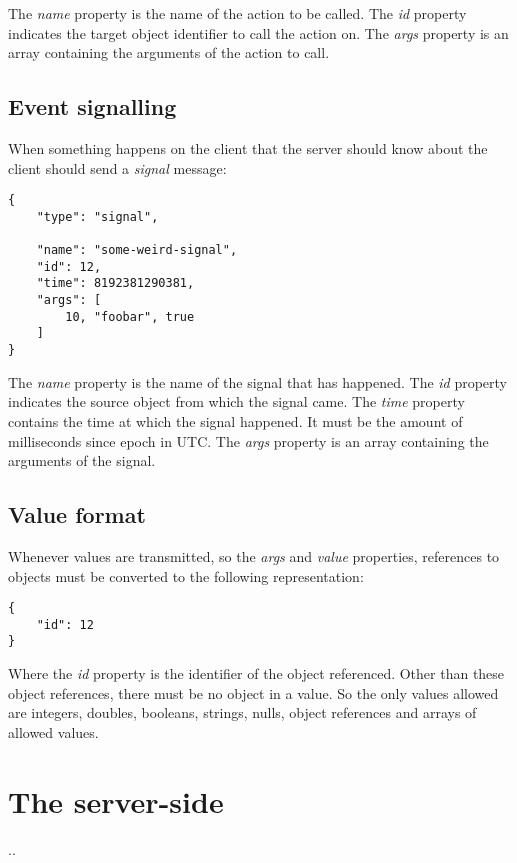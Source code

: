 \documentclass[11pt]{article}
\begin{document}
The \textit{name} property is the name of the action to be called.
The \textit{id} property indicates the target object identifier to call the action on.
The \textit{args} property is an array containing the arguments of the action to call.

\subsection{Event signalling}

When something happens on the client that the server should know about the client should send a \textit{signal} message:

\begin{verbatim}
{
    "type": "signal",

    "name": "some-weird-signal",
    "id": 12,
    "time": 8192381290381,
    "args": [
        10, "foobar", true
    ]
}
\end{verbatim}

The \textit{name} property is the name of the signal that has happened.
The \textit{id} property indicates the source object from which the signal came.
The \textit{time} property contains the time at which the signal happened.
It must be the amount of milliseconds since epoch in UTC.
The \textit{args} property is an array containing the arguments of the signal.

\subsection{Value format}

Whenever values are transmitted, so the \textit{args} and \textit{value} properties, references to objects must be converted to the following representation:

\begin{verbatim}
{
    "id": 12
}
\end{verbatim}

Where the \textit{id} property is the identifier of the object referenced.
Other than these object references, there must be no object in a value.
So the only values allowed are integers, doubles, booleans, strings, nulls, object references and arrays of allowed values.

\newpage
\section{The server-side}

..
\end{document}
